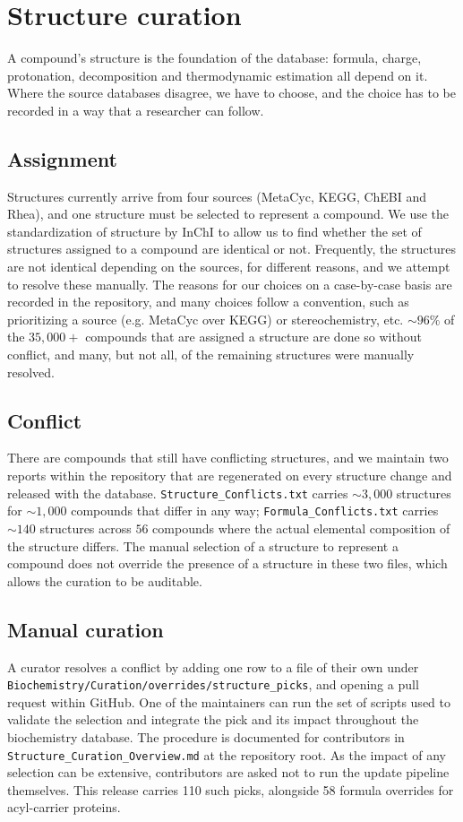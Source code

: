 \section{Structure curation}\label{sec:s1}

A compound's structure is the foundation of the database: formula, charge, protonation, decomposition and thermodynamic estimation all depend on it. Where the source databases disagree, we have to choose, and the choice has to be recorded in a way that a researcher can follow.

\subsection{Assignment} Structures currently arrive from four sources (MetaCyc, KEGG, ChEBI and Rhea), and one structure must be selected to represent a compound. We use the standardization of structure by InChI to allow us to find whether the set of structures assigned to a compound are identical or not. Frequently, the structures are not identical depending on the sources, for different reasons, and we attempt to resolve these manually. The reasons for our choices on a case-by-case basis are recorded in the repository, and many choices follow a convention, such as prioritizing a source (e.g. MetaCyc over KEGG) or stereochemistry, etc. $\sim96\%$ of the $35,000+$ compounds that are assigned a structure are done so without conflict, and many, but not all, of the remaining structures were manually resolved.

\subsection{Conflict} There are compounds that still have conflicting structures, and we maintain two reports within the repository that are regenerated on every structure change and released with the database. \texttt{Structure\_Conflicts.txt} carries $\sim3,000$ structures for $\sim1,000$ compounds that differ in any way; \texttt{Formula\_Conflicts.txt} carries $\sim140$ structures across $56$ compounds where the actual elemental composition of the structure differs. The manual selection of a structure to represent a compound does not override the presence of a structure in these two files, which allows the curation to be auditable.

\subsection{Manual curation} A curator resolves a conflict by adding one row to a file of their own under \texttt{Biochemistry/\allowbreak Curation/\allowbreak overrides/\allowbreak structure\_picks}, and opening a pull request within GitHub. One of the maintainers can run the set of scripts used to validate the selection and integrate the pick and its impact throughout the biochemistry database. The procedure is documented for contributors in \texttt{Structure\_Curation\_Overview.md} at the repository root. As the impact of any selection can be extensive, contributors are asked not to run the update pipeline themselves. This release carries 110 such picks, alongside 58 formula overrides for acyl-carrier proteins.
